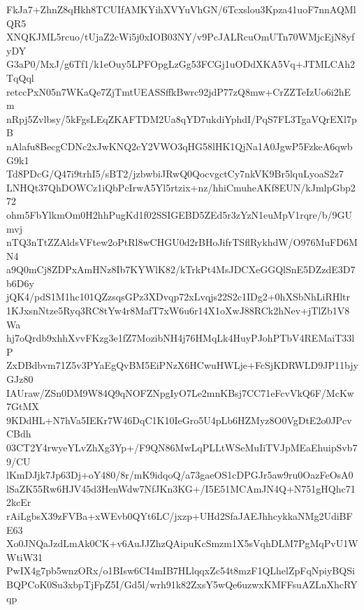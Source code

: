 FkJa7+ZhnZ8qHkh8TCUIfAMKYihXVYuVhGN/6Tcxslou3Kpza41uoF7nnAQMlQR5
XNQKJML5rcuo/tUjaZ2cWi5j0xIOB03NY/v9PcJALRcuOmUTn70WMjcEjN8yfyDY
G3aP0/MxJ/g6Tf1/k1eOuy5LPFOpgLzGg53FCGj1uODdXKA5Vq+JTMLCAh2TqQql
retccPxN05n7WKaQe7ZjTmtUEASSffkBwrc92jdP77zQ8mw+CrZZTeIzUo6i2hEm
nRpj5Zvlbsy/5kFgsLEqZKAFTDM2Ua8qYD7ukdiYphdI/PqS7FL3TgaVQrEXl7pB
nAlafu8BecgCDNc2xJwKNQ2cY2VWO3qHG58lHK1QjNa1A0JgwP5FzkeA6qwbG9k1
Td8PDcG/Q47i9trhI5/sBT2/jzbwbiJRwQ0QocvgctCy7nkVK9Br5lquLyoaS2z7
LNHQt37QhDOWCz1iQbPcIrwA5Yl5rtzix+nz/hhiCmuheAKf8EUN/kJmlpGbp272
ohm5FbYlkmOm0H2hhPugKd1f02SSIGEBD5ZEd5r3zYzN1euMpV1rqre/b/9GUmvj
nTQ3nTtZZAldsVFtew2oPtRl8wCHGU0d2rBHoJifrTSflRykhdW/O976MuFD6MN4
a9Q0mCj8ZDPxAmHNz8Ib7KYWlK82/kTrkPt4MsJDCXeGGQlSnE5DZzdE3D7b6D6y
jQK4/pdS1M1hc101QZzsqsGPz3XDvqp72xLvqjs22S2c1IDg2+0hXSbNhLiRHltr
1KJxsnNtze5Ryq3RC8tYw4r8MafT7xW6u6r14X1oXwJ88RCk2hNev+jTlZb1V8Wa
hj7oQrdb9xhhXvvFKzg3e1fZ7MozibNH4j76HMqLk4HuyPJohPTbV4REMaiT33lP
ZxDBdbvm71Z5v3PYaEgQvBM5EiPNzX6HCwuHWLje+FcSjKDRWLD9JP11bjyGJz80
IAUraw/ZSn0DM9W84Q9qNOFZNpgIyO7Le2mnKBsj7CC71eFcvVkQ6F/McKw7GtMX
9KDdHL+N7hVa5IEKr7W46DqC1K10IeGro5U4pLb6HZMyz8O0VgDtE2o0JPcvCBdh
03CT2Y4rwyeYLvZhXg3Yp+/F9QN86MwLqPLLtWSeMuIiTVJpMEaEhuipSvb79/CU
lKmDJjk7Jp63Dj+oY480/8r/mK9idqoQ/a73gaeOS1cDPGJr5aw9ru0OazFeOsA0
lSaZK55Rw6HJV45d3HenWdw7NfJKn3KG+/I5E51MCAmJN4Q+N751gHQhc712kcEr
rAiLgbsX39zFVBa+xWEvb0QYt6LC/jxzp+UHd2SfaJAEJhhcykkaNMg2UdiBFE63
Xo0JNQaJzdLmAk0CK+v6AuJJZhzQAipuKcSmzm1X5sVqhDLM7PgMqPvU1WWtiW31
PwIX4g7pb5wnzORx/o1BIsw6CI4mIB7HLlqqxZc54t8mzF1QLhelZpFqNpiyBQSi
BQPCoK0Su3xbpTjFpZ5I/Gd5l/wrh91k82ZxsY5wQe6uzwxKMFFsuAZLnXhcRYqp
